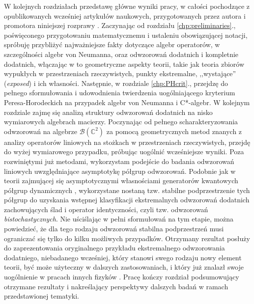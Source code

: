 W kolejnych rozdziałach przedstawę główne wyniki pracy,
w całości pochodzące z opublikowanych wcześniej artykułów naukowych,
przygotowanych przez autora i promotora niniejszej rozprawy
\cite{miller2015extremal,miller2014horodeckis,miller2015stable,miller2015topology}.
Zaczynając od rozdziału \ref{chp:preliminaries}.,
poświęconego przygotowaniu
matematycznemu i ustaleniu obowiązującej notacji,
spróbuję przybliżyć najważniejsze fakty dotyczące algebr operatorów,
w szczególności algebr von Neumanna,
oraz odwzorowań dodatnich i kompletnie dodatnich,
włączając w to geometryczne aspekty teorii,
takie jak teoria zbiorów wypukłych w przestrzeniach rzeczywistych,
punkty ekstremalne, ,,wystające'' (\emph{exposed}) i ich własności.
Następnie,
w rozdziale \ref{chp:PHcrit}.,
przejdzę do pełnego sformułowania i udowodnienia twierdzenia
uogólniającego kryterium Peresa-Horodeckich na przypadek algebr von Neumanna
i C*-algebr.
W kolejnym rozdziale zajmę się analizą struktury odwzorowań dodatnich na
nisko wymiarowych algebrach macierzy.
Poczynając od pełnego scharakteryzowania odwzorowań na algebrze
$\mathcal{B}(\mathbb{C}^{2})$ za pomocą geometrycznych metod znanych z analizy
operatorów liniowych na stożkach w przestrzeniach rzeczywistych,
przejdę do wyżej wymiarowego przypadku,
próbując uogólnić wcześniejsze wyniki.
Poza rozwiniętymi już metodami,
wykorzystam podejście do badania odwzorowań
liniowych uwzględniające asymptotykę półgrup odwzorowań.
Podobnie jak w teorii
zajmującej się asymptotycznymi własnościami generatorów kwantowych półgrup
dynamicznych \cite{olkiewicz1999environment},
wykorzystane nostaną tzw. stabilne podprzestrzenie tych półgrup do uzyskania
wstępnej klasyfikacji ekstremalnych odwzorowań dodatnich
zachowujących ślad i operator identyczności,
czyli tzw. odwzorowań \emph{bistochastycznych}.
Nie uściślając w pełni sformułowań na tym etapie,
można powiedzieć,
że dla tego rodzaju odwzorowań stabilna podprzestrzeń musi ograniczać się
tylko do kilku możliwych przypadków.
Otrzymany rezultat posłuży do zaprezentowania oryginalnego przykładu
ekstremalnego odwzorowania dodatniego, niebadanego wcześniej,
który stanowi swego rodzaju nowy element teorii,
być może użyteczny w dalszych zastosowaniach,
i który już znalazł swoje uogólnienie w pracach innych fizyków
\cite{rutkowski2015class}.
Pracę kończy rozdział podsumowujący otrzymane rezultaty i nakreślający
perspektywy dalszych badań w ramach przedstawionej tematyki.

